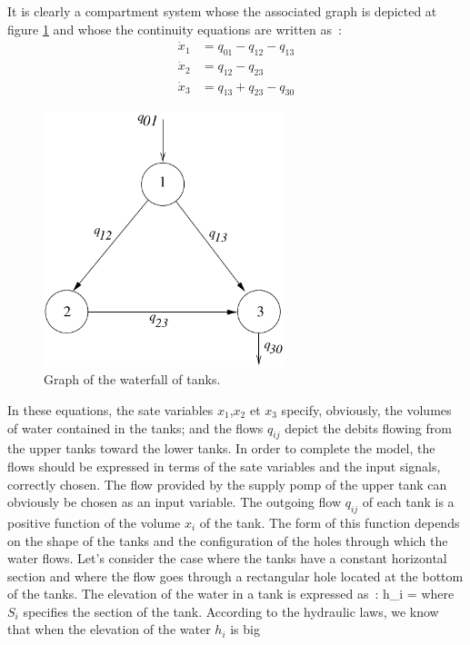 \begin{exemple}
It is clearly a compartment system whose the associated graph 
is depicted at figure \ref{Fig:grafassoc} and whose the continuity 
equations are written as~:
\begin{equation*} \begin{split} 
\dot x_1 &= q_{01} - q_{12} - q_{13} \\
\dot x_2 &=  q_{12} - q_{23} \\
\dot x_3 &= q_{13} + q_{23} - q_{30} 
\end{split} \end{equation*}
\begin{figure}[h] 
\begin{center}
\includegraphics[width=7cm]{grafassoc}
\caption{Graph of the waterfall of tanks.}
\label{Fig:grafassoc}
\end{center} 
\end{figure}
In these equations, the sate variables $x_1$,$ x_2$ et $x_3$ specify, 
obviously, the volumes of water contained in the tanks; and the flows 
$q_{ij}$ depict the debits flowing from the upper tanks toward the lower 
tanks. In order to complete the model, the flows should be expressed in
terms of the sate variables and the input signals, correctly chosen.
The flow provided by the supply pomp of the upper tank can obviously be 
chosen as an input variable. The outgoing flow $q_{ij}$ of each tank 
is a positive function of the volume $x_i$ of the tank. The form of 
this function depends on the shape of the tanks and the configuration of 
the holes through which the water flows. Let's consider the case where the tanks 
have a constant horizontal section and where the flow goes through a 
rectangular hole located at the bottom of the tanks. The elevation of the water in 
a tank is expressed as~:
\eqnn
h_i = 
\eeqnn
where $S_{i}$ specifies the section of the tank.
According to the hydraulic laws, we know that when the elevation of the water $h_i$ is big 

\end{exemple}
